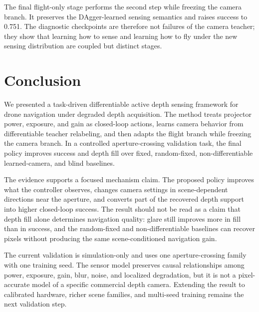\documentclass[letterpaper,journal]{IEEEtran}
\begin{document}
The final flight-only stage performs the second step while freezing the camera
branch. It preserves the DAgger-learned sensing semantics and raises success
to 0.751. The diagnostic checkpoints are therefore not failures of the camera
teacher; they show that learning how to sense and learning how to fly under the
new sensing distribution are coupled but distinct stages.

\section{Conclusion}
We presented a task-driven differentiable active depth sensing framework for
drone navigation under degraded depth acquisition. The method treats projector
power, exposure, and gain as closed-loop actions, learns camera behavior from
differentiable teacher relabeling, and then adapts the flight branch while
freezing the camera branch. In a controlled aperture-crossing validation task,
the final policy improves success and depth fill over fixed, random-fixed,
non-differentiable learned-camera, and blind baselines.

The evidence supports a focused mechanism claim. The proposed policy improves
what the controller observes, changes camera settings in scene-dependent
directions near the aperture, and converts part of the recovered depth support
into higher closed-loop success. The result should not be read as a claim that
depth fill alone determines navigation quality: glare still improves more in
fill than in success, and the random-fixed and non-differentiable baselines can
recover pixels without producing the same scene-conditioned navigation gain.

The current validation is simulation-only and uses one aperture-crossing family
with one training seed. The sensor model preserves causal relationships among
power, exposure, gain, blur, noise, and localized degradation, but it is not a
pixel-accurate model of a specific commercial depth camera. Extending the
result to calibrated hardware, richer scene families, and multi-seed training
remains the next validation step.



\end{document}
